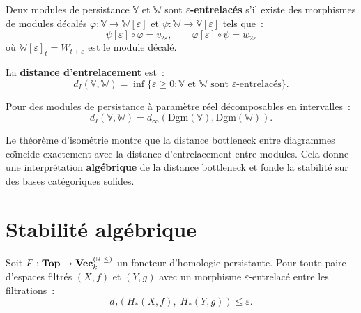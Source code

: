 \begin{definition}
Deux modules de persistance $\mathbb{V}$ et $\mathbb{W}$ sont
\textbf{$\varepsilon$-entrelac\'es} s'il existe des morphismes de
modules d\'ecal\'es $\varphi : \mathbb{V} \to \mathbb{W}[\varepsilon]$
et $\psi : \mathbb{W} \to \mathbb{V}[\varepsilon]$ tels que~:
\[
  \psi[\varepsilon] \circ \varphi = v_{2\varepsilon}, \qquad
  \varphi[\varepsilon] \circ \psi = w_{2\varepsilon}
\]
o\`u $\mathbb{W}[\varepsilon]_t = W_{t+\varepsilon}$ est le module d\'ecal\'e.
\end{definition}

\begin{definition}
La \textbf{distance d'entrelacement} est~:
\[
  d_I(\mathbb{V}, \mathbb{W}) = \inf\{\varepsilon \geq 0 :
  \mathbb{V} \text{ et } \mathbb{W} \text{ sont }
  \varepsilon\text{-entrelac\'es}\}.
\]
\end{definition}

\begin{theoreme}
\label{thm:isometrie}
Pour des modules de persistance \`a param\`etre r\'eel d\'ecomposables
en intervalles~:
\[
  d_I(\mathbb{V}, \mathbb{W}) = d_\infty(\mathrm{Dgm}(\mathbb{V}),
  \mathrm{Dgm}(\mathbb{W})).
\]
\end{theoreme}

\begin{intuition}
Le th\'eor\`eme d'isom\'etrie montre que la distance bottleneck entre
diagrammes co\"\i ncide exactement avec la distance d'entrelacement
entre modules. Cela donne une interpr\'etation \textbf{alg\'ebrique}
de la distance bottleneck et fonde la stabilit\'e sur des bases
cat\'egoriques solides.
\end{intuition}

\section{Stabilit\'e alg\'ebrique}
\label{sec:stabilite_algebrique}

\begin{theoreme}
Soit $F : \mathbf{Top} \to \mathbf{Vec}_k^{(\mathbb{R}, \leq)}$ un foncteur
d'homologie persistante. Pour toute paire d'espaces filtr\'es
$(X, f)$ et $(Y, g)$ avec un morphisme $\varepsilon$-entrelac\'e
entre les filtrations~:
\[
  d_I(H_*(X, f),\; H_*(Y, g)) \leq \varepsilon.
\]
\end{theoreme}

